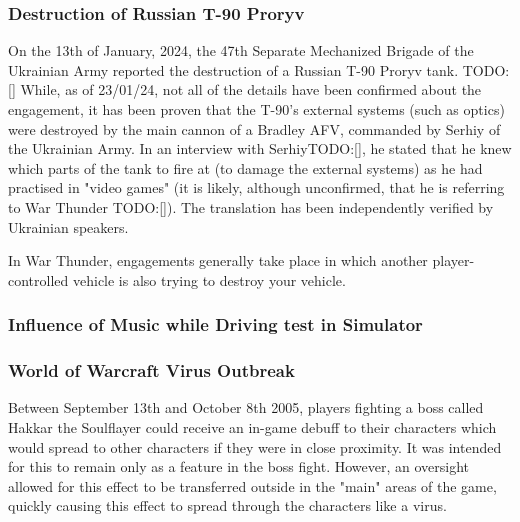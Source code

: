 \documentclass{article}
\begin{document}
\subsubsection{Destruction of Russian T-90 Proryv}

On the 13th of January, 2024, the 47th Separate Mechanized Brigade of the Ukrainian Army reported the destruction of a Russian T-90 Proryv tank. TODO: [] While, as of 23/01/24, not all of the details have been confirmed about the engagement, it has been proven that the T-90's external systems (such as optics) were destroyed by the main cannon of a Bradley AFV, commanded by Serhiy of the Ukrainian Army. In an interview with SerhiyTODO:[], he stated that he knew which parts of the tank to fire at (to damage the external systems) as he had practised in "video games" (it is likely, although unconfirmed, that he is referring to War Thunder TODO:[]). The translation has been independently verified by Ukrainian speakers.

In War Thunder, engagements generally take place in which another player-controlled vehicle is also trying to destroy your vehicle.



\subsubsection{Influence of Music while Driving test in Simulator}


\subsubsection{World of Warcraft Virus Outbreak}

Between September 13th and October 8th 2005, players fighting a boss called Hakkar the Soulflayer could receive an in-game debuff to their characters which would spread to other characters if they were in close proximity. It was intended for this to remain only as a feature in the boss fight. However, an oversight allowed for this effect to be transferred outside in the "main" areas of the game, quickly causing this effect to spread through the characters like a virus. 
\end{document}
